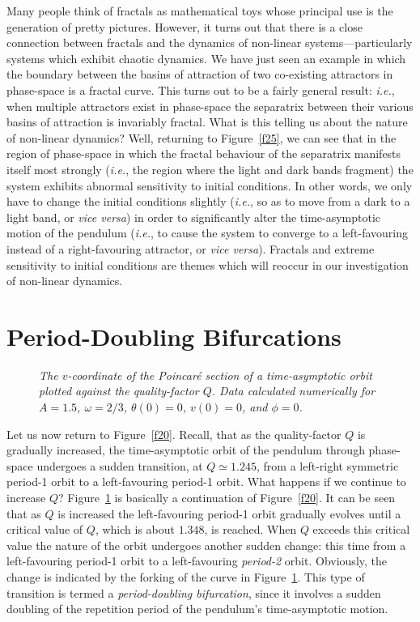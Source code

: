 Many people think of fractals as mathematical toys whose principal use is the generation
of pretty pictures. However, it turns out that there is a close connection between fractals
and the dynamics of non-linear systems---particularly systems which exhibit chaotic
dynamics. We have just seen an example in which the boundary between the basins of attraction of two
co-existing attractors in phase-space is a fractal curve. This turns out to be a fairly
general result: {\em i.e.}, when multiple attractors exist in phase-space the separatrix
between their various basins of attraction is invariably fractal. What is this telling us
about the nature of non-linear dynamics? Well, returning to Figure~\ref{f25}, we can see that in the
region of phase-space in which the fractal behaviour of the separatrix manifests itself most
strongly ({\em i.e.}, the region where the light and dark bands fragment) the system exhibits
abnormal sensitivity to  initial conditions. In other words, we only have to change the initial
conditions slightly ({\em i.e.}, so as to move from a dark to a light band, or {\em vice versa})
in order to significantly alter the time-asymptotic motion of the pendulum ({\em i.e.}, to cause the
system to converge to a left-favouring  instead of  a right-favouring attractor, 
or {\em vice versa}). Fractals and extreme sensitivity to initial conditions
are themes which will reoccur in our investigation of non-linear dynamics.

\section{Period-Doubling Bifurcations}
\begin{figure}
\epsfysize=2.5in
\centerline{}
\caption{\em The $v$-coordinate of the Poincar\'{e} section of a time-asymptotic orbit
plotted against the quality-factor $Q$. Data
 calculated numerically for
$A=1.5$, $\omega=2/3$, $\theta(0)=0$, $v(0)=0$, and $\phi=0$. }\label{f29}
\end{figure}
Let us now return to Figure~\ref{f20}. Recall, that as the quality-factor $Q$
is gradually increased,  the time-asymptotic orbit of the
pendulum through phase-space undergoes a sudden transition, at $Q\simeq 1.245$, from a
left-right symmetric period-1  orbit to a left-favouring period-1 orbit. What happens if
we continue to increase $Q$? Figure~\ref{f29} is basically a continuation of Figure~\ref{f20}. 
It can be seen that as $Q$ is increased the left-favouring period-1 orbit gradually
evolves until a critical value of $Q$, which is about $1.348$, is reached.
When $Q$ exceeds this critical value the nature of the orbit undergoes another sudden change:
this time
from a left-favouring period-1 orbit to a left-favouring {\em period-2}\/ orbit. 
Obviously, the
change is
indicated by the forking of the curve in Figure~\ref{f29}. This type of transition
is termed a {\em period-doubling bifurcation}, since it involves a 
sudden doubling of the
repetition period of the pendulum's time-asymptotic motion. 

